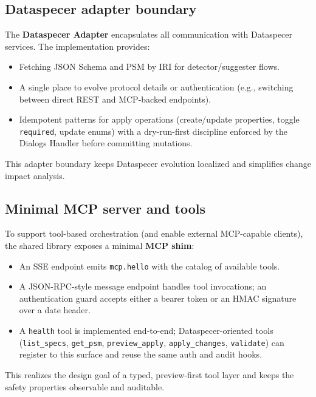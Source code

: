 \subsection{Dataspecer adapter boundary}
The \textbf{Dataspecer Adapter} encapsulates all communication with Dataspecer services. The implementation provides:
\begin{itemize}
  \item Fetching JSON Schema and PSM by IRI for detector/suggester flows.
  \item A single place to evolve protocol details or authentication (e.g., switching between direct REST and MCP-backed endpoints).
  \item Idempotent patterns for apply operations (create/update properties, toggle \texttt{required}, update enums) with a dry-run-first discipline enforced by the Dialogs Handler before committing mutations.
\end{itemize}
This adapter boundary keeps Dataspecer evolution localized and simplifies change impact analysis.

\subsection{Minimal MCP server and tools}
To support tool-based orchestration (and enable external MCP-capable clients), the shared library exposes a minimal \textbf{MCP shim}:
\begin{itemize}
  \item An SSE endpoint emits \texttt{mcp.hello} with the catalog of available tools.
  \item A JSON-RPC-style message endpoint handles tool invocations; an authentication guard accepts either a bearer token or an HMAC signature over a date header.
  \item A \texttt{health} tool is implemented end-to-end; Dataspecer-oriented tools (\texttt{list\_specs}, \texttt{get\_psm}, \texttt{preview\_apply}, \texttt{apply\_changes}, \texttt{validate}) can register to this surface and reuse the same auth and audit hooks.
\end{itemize}
This realizes the design goal of a typed, preview-first tool layer and keeps the safety properties observable and auditable.


